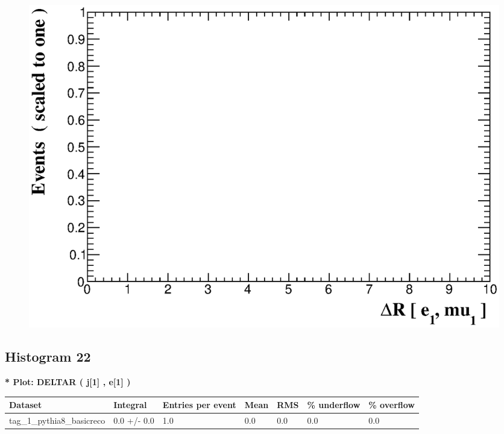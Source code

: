 \documentclass[a4paper, 10pt]{article}
\begin{document}
\begin{figure}[H]
  \begin{center}
    \includegraphics[scale=0.45]{selection_20.eps}\\
\caption{   }
  \end{center}
\end{figure}
      \newpage
\subsection{ Histogram 22}

\textbf{* Plot: DELTAR ( j[1] , e[1] ) }\\
   \begin{table}[H]
  \begin{center}
    \begin{tabular}{|m{23.0mm}|m{23.0mm}|m{18.0mm}|m{19.0mm}|m{19.0mm}|m{19.0mm}|m{19.0mm}|}
      \hline
      {\cellcolor{yellow}         Dataset}& {\cellcolor{yellow}         Integral}& {\cellcolor{yellow}         Entries per event}& {\cellcolor{yellow}         Mean}& {\cellcolor{yellow}         RMS}& {\cellcolor{yellow}         \% underflow}& {\cellcolor{yellow}         \% overflow}\\
      \hline
      {\cellcolor{white}         tag\_1\_pythia8\_basicreco}& {\cellcolor{white}         0.0 +/\-- 0.0}& {\cellcolor{white}         1.0}& {\cellcolor{white}         0.0}& {\cellcolor{white}         0.0}& {\cellcolor{green}         0.0}& {\cellcolor{green}         0.0}\\
\hline
    \end{tabular}
  \end{center}
\end{table}
\end{document}
